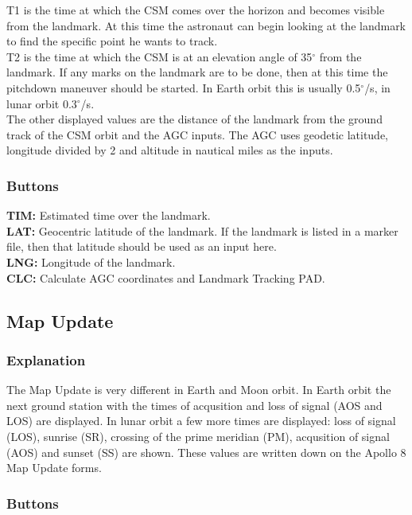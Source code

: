 \documentclass[11pt]{article} %
\begin{document}
T1 is the time at which the CSM comes over the horizon and becomes visible from the landmark. At this time the astronaut can begin looking at the landmark to find the specific point he wants to track. \\
T2 is the time at which the CSM is at an elevation angle of 35$^{\circ}$ from the landmark. If any marks on the landmark are to be done, then at this time the pitchdown maneuver should be started. In Earth orbit this is usually 0.5$^{\circ}$/s, in lunar orbit 0.3$^{\circ}$/s. \\
The other displayed values are the distance of the landmark from the ground track of the CSM orbit and the AGC inputs. The AGC uses geodetic latitude, longitude divided by 2 and altitude in nautical miles as the inputs.\\

\subsubsection{Buttons}

\textbf{TIM:} Estimated time over the landmark.\\
\textbf{LAT:} Geocentric latitude of the landmark.  If the landmark is listed in a marker file, then that latitude should be used as an input here.\\
\textbf{LNG:} Longitude of the landmark.\\
\textbf{CLC:} Calculate AGC coordinates and Landmark Tracking PAD.\\

\subsection{Map Update}

\subsubsection{Explanation}

The Map Update is very different in Earth and Moon orbit. In Earth orbit the next ground station with the times of acqusition and loss of signal (AOS and LOS) are displayed.  In lunar orbit a few more times are displayed: loss of signal (LOS), sunrise (SR), crossing of the prime meridian (PM), acqusition of signal (AOS) and sunset (SS) are shown. These values are written down on the Apollo 8 Map Update forms.\\ 

\subsubsection{Buttons}
\end{document}
